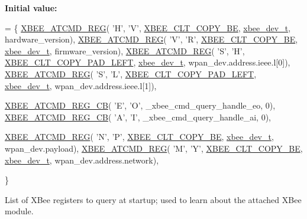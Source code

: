 {\bfseries Initial value\+:}
\begin{DoxyCode}
= \{
   \hyperlink{group__xbee__atcmd_gaafe33c3d8ea48b42b25d1183eaf93071}{XBEE\_ATCMD\_REG}( \textcolor{charliteral}{'H'}, \textcolor{charliteral}{'V'}, \hyperlink{group__xbee__atcmd_gga1bd8ecd38c107579d20ded3c79a7d70ba0be0c682bc30049849b0c169b661c537}{XBEE\_CLT\_COPY\_BE}, 
      \hyperlink{structxbee__dev__t}{xbee\_dev\_t}, hardware\_version),
   \hyperlink{group__xbee__atcmd_gaafe33c3d8ea48b42b25d1183eaf93071}{XBEE\_ATCMD\_REG}( \textcolor{charliteral}{'V'}, \textcolor{charliteral}{'R'}, \hyperlink{group__xbee__atcmd_gga1bd8ecd38c107579d20ded3c79a7d70ba0be0c682bc30049849b0c169b661c537}{XBEE\_CLT\_COPY\_BE}, 
      \hyperlink{structxbee__dev__t}{xbee\_dev\_t}, firmware\_version),
   \hyperlink{group__xbee__atcmd_gaafe33c3d8ea48b42b25d1183eaf93071}{XBEE\_ATCMD\_REG}( \textcolor{charliteral}{'S'}, \textcolor{charliteral}{'H'}, \hyperlink{group__xbee__atcmd_gga1bd8ecd38c107579d20ded3c79a7d70ba5450809b1aae150ec7dfb4c8faa8161a}{XBEE\_CLT\_COPY\_PAD\_LEFT}, 
      \hyperlink{structxbee__dev__t}{xbee\_dev\_t}, wpan\_dev.address.ieee.l[0]),
   \hyperlink{group__xbee__atcmd_gaafe33c3d8ea48b42b25d1183eaf93071}{XBEE\_ATCMD\_REG}( \textcolor{charliteral}{'S'}, \textcolor{charliteral}{'L'}, \hyperlink{group__xbee__atcmd_gga1bd8ecd38c107579d20ded3c79a7d70ba5450809b1aae150ec7dfb4c8faa8161a}{XBEE\_CLT\_COPY\_PAD\_LEFT}, 
      \hyperlink{structxbee__dev__t}{xbee\_dev\_t}, wpan\_dev.address.ieee.l[1]),





   \hyperlink{group__xbee__atcmd_gabbaf60bd4d186b860fd58c8a6111e9f9}{XBEE\_ATCMD\_REG\_CB}( \textcolor{charliteral}{'E'}, \textcolor{charliteral}{'O'}, \_xbee\_cmd\_query\_handle\_eo, 0),
   \hyperlink{group__xbee__atcmd_gabbaf60bd4d186b860fd58c8a6111e9f9}{XBEE\_ATCMD\_REG\_CB}( \textcolor{charliteral}{'A'}, \textcolor{charliteral}{'I'}, \_xbee\_cmd\_query\_handle\_ai, 0),
   
   \hyperlink{group__xbee__atcmd_gaafe33c3d8ea48b42b25d1183eaf93071}{XBEE\_ATCMD\_REG}( \textcolor{charliteral}{'N'}, \textcolor{charliteral}{'P'}, \hyperlink{group__xbee__atcmd_gga1bd8ecd38c107579d20ded3c79a7d70ba0be0c682bc30049849b0c169b661c537}{XBEE\_CLT\_COPY\_BE}, 
      \hyperlink{structxbee__dev__t}{xbee\_dev\_t}, wpan\_dev.payload),
   \hyperlink{group__xbee__atcmd_gaafe33c3d8ea48b42b25d1183eaf93071}{XBEE\_ATCMD\_REG}( \textcolor{charliteral}{'M'}, \textcolor{charliteral}{'Y'}, \hyperlink{group__xbee__atcmd_gga1bd8ecd38c107579d20ded3c79a7d70ba0be0c682bc30049849b0c169b661c537}{XBEE\_CLT\_COPY\_BE}, 
      \hyperlink{structxbee__dev__t}{xbee\_dev\_t}, wpan\_dev.address.network),

\}
\end{DoxyCode}
List of X\+Bee registers to query at startup; used to learn about the attached X\+Bee module. \mbox{\label{group__xbee__atcmd_ga1a5aaa930940857f68f245eeb89506b5}} 
